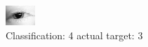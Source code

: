 \begin{figure}[h!]
\begin{center}
\includegraphics[width=0.60\columnwidth]{figures/ID141_class_4_target_3.png}
\end{center}
\caption{ Classification: 4 actual target: 3}
\label{fig:ID141_class_4_target_3}
\end{figure}
